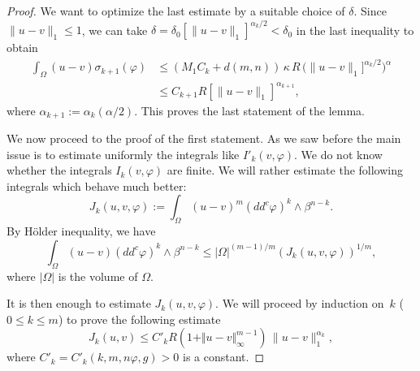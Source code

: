 \documentclass[JEP,XML,SOM,Unicode]{cedram}
\theoremstyle{definition}
\begin{document}
\begin{proof}
We want to optimize the last estimate by a suitable choice of $\delta$. Since $ \|u-v\|_1 \leq 1$, we can take $\delta= \delta_0 [\|u-v\|_1]^{\alpha_k\slash 2} < \delta_0$ in the last inequality to obtain
\begin{align*}
\int_{\Omega}(u-v) \sigma_{k+1}(\varphi) &\leq  (M_1 C_k
+ d (m,n))\, \kappa \, R \, \bigl(\|u-v\|_1]^{\alpha_k \slash 2} \bigr)^{\alpha } \\
& \leq C_{k + 1} R [\|u-v\|_1]^{\alpha_{k+ 1}},
\end{align*}
where $\alpha_{k + 1} := \alpha_k (\alpha \slash 2)$.
This proves the last statement of the lemma.

We now proceed to the proof of the first statement.
As we saw before the main issue is to estimate uniformly the integrals like $ I'_k (v,\varphi)$.
We do not know whether the integrals $I_k (v,\varphi)$ are finite. We will rather estimate the following integrals which behave much better:
\[
J_{k} (u,v,\varphi) := \int_{\Omega} (u-v)^m (dd^c \varphi)^{k} \wedge \beta^{n -k }.
\]
By Hölder inequality, we have
\begin{equation} \label{eq:Hineq2}
\int_\Omega (u-v) (dd^c \varphi)^k \wedge \beta^{n-k} \leq \vert \Omega\vert^{ (m-1) \slash m}\left(J_k (u,v,\varphi)\right)^{1 \slash m},
\end{equation}
where $\vert \Omega\vert$ is the volume of $\Omega$.

It is then enough to estimate $J_k (u,v,\varphi)$. We will proceed by induction on~$k$ \hbox{($0 \leq k \leq m$)} to prove the following estimate
\begin{equation} \label{eq:Jk}
J_k (u,v) \leq C'_k R (1 + \Vert u - v\Vert_{\infty}^{m -1} ) \, \|u-v\|_1^{\alpha_k},
\end{equation}
where $C'_k = C'_k (k,m,n\varphi,g) > 0$ is a constant.


\end{proof}
\end{document}

